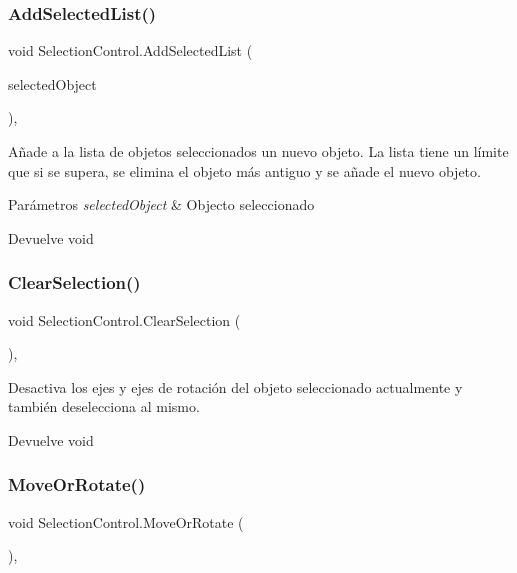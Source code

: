 \subsubsection{\texorpdfstring{AddSelectedList()}{AddSelectedList()}}
{\footnotesize\ttfamily void Selection\+Control.\+Add\+Selected\+List (\begin{DoxyParamCaption}\item[{Game\+Object}]{selected\+Object }\end{DoxyParamCaption})\hspace{0.3cm}{\ttfamily [inline]}, {\ttfamily [private]}}

Añade a la lista de objetos seleccionados un nuevo objeto. La lista tiene un límite que si se supera, se elimina el objeto más antiguo y se añade el nuevo objeto. 
\begin{DoxyParams}{Parámetros}
{\em selected\+Object} & Objecto seleccionado \\
\hline
\end{DoxyParams}
\begin{DoxyReturn}{Devuelve}
void 
\end{DoxyReturn}
\mbox{\label{class_selection_control_a41c82620db4b415375d6579c5a0aa17b}} 
\subsubsection{\texorpdfstring{ClearSelection()}{ClearSelection()}}
{\footnotesize\ttfamily void Selection\+Control.\+Clear\+Selection (\begin{DoxyParamCaption}{ }\end{DoxyParamCaption})\hspace{0.3cm}{\ttfamily [inline]}, {\ttfamily [private]}}

Desactiva los ejes y ejes de rotación del objeto seleccionado actualmente y también deselecciona al mismo. \begin{DoxyReturn}{Devuelve}
void 
\end{DoxyReturn}
\mbox{\label{class_selection_control_a9684b6a02a6e31a00c6a87b5e9d29f62}} 
\subsubsection{\texorpdfstring{MoveOrRotate()}{MoveOrRotate()}}
{\footnotesize\ttfamily void Selection\+Control.\+Move\+Or\+Rotate (\begin{DoxyParamCaption}{ }\end{DoxyParamCaption})\hspace{0.3cm}{\ttfamily [inline]}, {\ttfamily [private]}}

